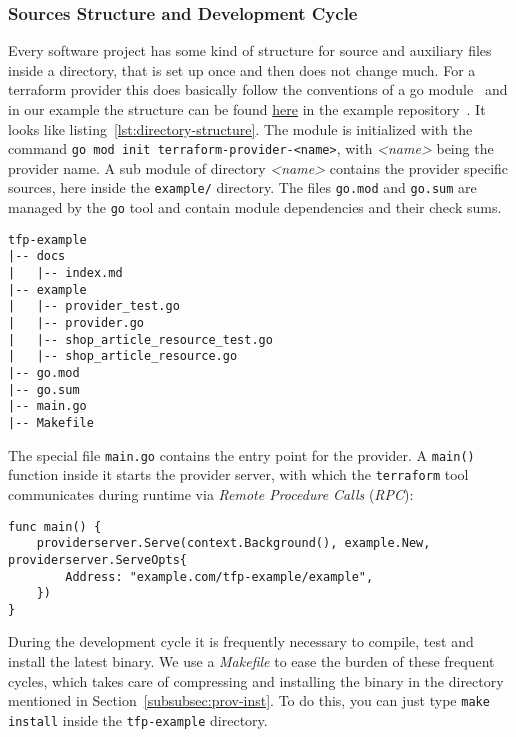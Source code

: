 \documentclass[paper=a4,11pt,numbers=noenddot]{article}
\begin{document}
\subsubsection{Sources Structure and Development Cycle}
\label{subsubsec:prov-sourc-struct}

Every software project has some kind of structure for source and auxiliary files inside a directory, that is set up once and then does not change much. For a terraform provider this does basically follow the conventions of a go module~\autocite{noauthor_go_modules_nodate} and in our example the structure can be found \href{https://github.com/ecky-l/terraform-provider-example/tree/main/src/tfp-example}{here} in the example repository~\autocite{ecky-l_terraform-provider-example_nodate}. It looks like listing~\ref{lst:directory-structure}. The module is initialized with the command \verb'go mod init terraform-provider-<name>', with \emph{<name>} being the provider name. A sub module of directory \emph{<name>} contains the provider specific sources, here inside the \verb'example/' directory. The files \verb'go.mod' and \verb'go.sum' are managed by the \verb'go' tool and contain module dependencies and their check sums.

\begin{lstlisting}[label=lst:directory-structure]
tfp-example
|-- docs
|   |-- index.md
|-- example
|   |-- provider_test.go
|   |-- provider.go
|   |-- shop_article_resource_test.go
|   |-- shop_article_resource.go
|-- go.mod
|-- go.sum
|-- main.go
|-- Makefile
\end{lstlisting}

The special file \verb'main.go' contains the entry point for the provider. A \verb'main()' function inside it starts the provider server, with which the \verb'terraform' tool communicates during runtime via \emph{Remote Procedure Calls} (\emph{RPC}):

\begin{lstlisting}[label=lst:main]
func main() {
    providerserver.Serve(context.Background(), example.New, providerserver.ServeOpts{
        Address: "example.com/tfp-example/example",
    })
}
\end{lstlisting}

During the development cycle it is frequently necessary to compile, test and install the latest binary. We use a \emph{Makefile} to ease the burden of these frequent cycles, which takes care of compressing and installing the binary in the directory mentioned in Section~\ref{subsubsec:prov-inst}. To do this, you can just type \verb'make install' inside the \verb'tfp-example' directory.
\end{document}
